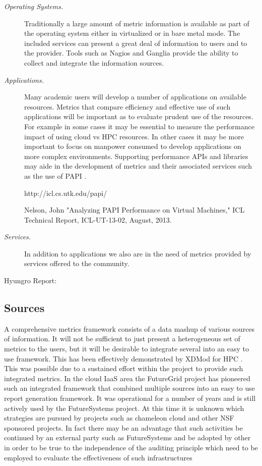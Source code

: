 \documentclass{sig-alternate-05-2015}
\begin{document}
\begin{description}
\item[\it Operating Systems.] Traditionally a large amount of metric
  information is available as part of the operating system either in
  virtualized or in bare metal mode. The included services can present a
  great deal of information to users and to the provider. Tools such
  as Nagios and Ganglia provide  the ability to collect and integrate
  the information sources.

\item[\it Applications.] Many academic users will develop a number of
  applications on available resources. Metrics that compare efficiency
  and effective use of such applications will be important as to
  evaluate prudent use of the resources. For example in some cases it
  may be essential to measure the performance impact of using cloud vs
  HPC resources. In other cases it may be more important to focus on
  manpower consumed to develop applications on more complex
  environments. Supporting performance APIs and libraries may aide in
  the development of metrics and their associated services such as the
  use of PAPI \cite{papi2014}.

http://icl.cs.utk.edu/papi/~\cite{papi-web}


Nelson, John "Analyzing PAPI Performance on Virtual Machines," ICL
Technical Report, ICL-UT-13-02, August, 2013.~\cite{JohnNelsonAnalyzingPAPI}

\item[\it Services.] In addition to applications we also are in the
  need of metrics provided by services offered to the community. 

\end{description}


Hyungro Report: \cite{LeeFGresource}

\subsection{Sources}

A comprehensive metrics framework consists of a data mashup of various
sources of information. It will not be sufficient to just present a
heterogeneous set of metrics to the users, but it will be desirable to
integrate several into an easy to use framework. This has been
effectively demonstrated by XDMod for HPC
\cite{las14cloudmeshmultiple,las14Impact,las12xdmod-kernel}. This was
possible due to a sustained effort within the project to provide such
integrated metrics. In the cloud IaaS area the FutureGrid project has
pioneered such an integrated framework that combined multiple sources
into an easy to use report generation framework. It was operational
for a number of years and is still actively used by the FutureSystems
project. At this time it is unknown which strategies are pursued by
projects such as chameleon cloud and other NSF sponsored projects.  In
fact there may be an advantage that such activities be continued by an
external party such as FutureSystems and be adopted by other in order
to be true to the independence of the auditing principle which need to
be employed to evaluate the effectiveness of such infrastructures
\end{document}
